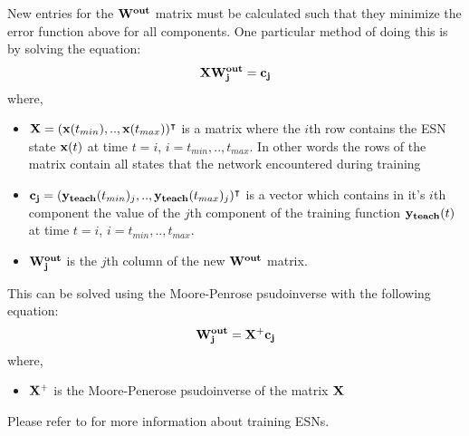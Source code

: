 \documentclass[10pt]{article}
\begin{document}
New entries for the ${\bf W^{out}}$ matrix must be calculated such that they minimize the error function above for all components. One particular method of doing this is by solving the equation:
\[
{\bf XW^{out}_j} = {\bf c_j}
\]
where,
\begin{itemize}
  \item ${\bf X}=({\bf x}(t_{min}),..,{\bf x}(t_{max}))^{\intercal}$ is a matrix where the $i$th row contains the ESN state ${\bf x}(t)$ at time $t=i$, $i=t_{min},..,t_{max}$. In other words the rows of the matrix contain all states that the network encountered during training
  \item ${\bf c_j}=({\bf y_{teach}}(t_{min})_j,..,{\bf y_{teach}}(t_{max})_j)^{\intercal}$ is a vector which contains in it's $i$th component the value of the $j$th component of the training function ${\bf y_{teach}}(t)$ at time $t=i$, $i=t_{min},..,t_{max}$.
  \item ${\bf W^{out}_j}$ is the $j$th column of the new ${\bf W^{out}}$ matrix.
\end{itemize}
This can be solved using the Moore-Penrose psudoinverse \cite{PsudoInverse} with the following equation:
\[
{\bf W^{out}_j}={\bf X}^+{\bf c_j}
\]
where,
\begin{itemize}
  \item ${\bf X}^+$ is the Moore-Penerose psudoinverse of the matrix ${\bf X}$
\end{itemize}
Please refer to \cite{JaegerESNTutorial} for more information about training ESNs.
\end{document}
